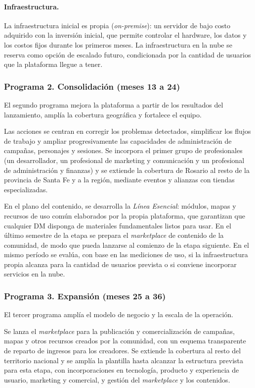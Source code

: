 \paragraph{Infraestructura.}
La infraestructura inicial es propia (\textit{on-premise}): un servidor de bajo costo adquirido con la inversión inicial, que permite controlar el hardware, los datos y los costos fijos durante los primeros meses. La infraestructura en la nube se reserva como opción de escalado futuro, condicionada por la cantidad de usuarios que la plataforma llegue a tener.

\subsubsection{Programa 2. Consolidación (meses 13 a 24)}
El segundo programa mejora la plataforma a partir de los resultados del lanzamiento, amplía la cobertura geográfica y fortalece el equipo.

Las acciones se centran en corregir los problemas detectados, simplificar los flujos de trabajo y ampliar progresivamente las capacidades de administración de campañas, personajes y sesiones. Se incorpora el primer grupo de profesionales (un desarrollador, un profesional de marketing y comunicación y un profesional de administración y finanzas) y se extiende la cobertura de Rosario al resto de la provincia de Santa Fe y a la región, mediante eventos y alianzas con tiendas especializadas.

En el plano del contenido, se desarrolla la \emph{Línea Esencial}: módulos, mapas y recursos de uso común elaborados por la propia plataforma, que garantizan que cualquier DM disponga de materiales fundamentales listos para usar. En el último semestre de la etapa se prepara el \textit{marketplace} de contenido de la comunidad, de modo que pueda lanzarse al comienzo de la etapa siguiente. En el mismo período se evalúa, con base en las mediciones de uso, si la infraestructura propia alcanza para la cantidad de usuarios prevista o si conviene incorporar servicios en la nube.

\subsubsection{Programa 3. Expansión (meses 25 a 36)}
El tercer programa amplía el modelo de negocio y la escala de la operación.

Se lanza el \textit{marketplace} para la publicación y comercialización de campañas, mapas y otros recursos creados por la comunidad, con un esquema transparente de reparto de ingresos para los creadores. Se extiende la cobertura al resto del territorio nacional y se amplía la plantilla hasta alcanzar la estructura prevista para esta etapa, con incorporaciones en tecnología, producto y experiencia de usuario, marketing y comercial, y gestión del \textit{marketplace} y los contenidos.

